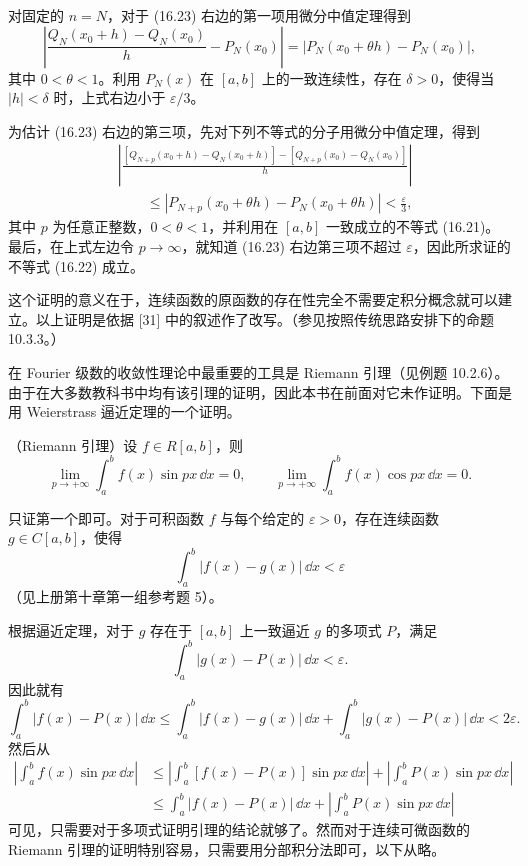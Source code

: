 \begin{xproof}
对固定的 $n=N$，对于 (16.23) 右边的第一项用微分中值定理得到
\[
  \left|\frac{Q_N(x_0+h)-Q_N(x_0)}h-P_N(x_0)\right|
  =|P_N(x_0+\theta h)-P_N(x_0)|,
\]
其中 $0<\theta<1$。利用 $P_N(x)$ 在 $[a,b]$ 上的一致连续性，存在 $\delta>0$，使得当 $|h|<\delta$ 时，上式右边小于 $\varepsilon/3$。

为估计 (16.23) 右边的第三项，先对下列不等式的分子用微分中值定理，得到
\[
\begin{aligned}
&\left|\frac{[Q_{N+p}(x_0+h)-Q_N(x_0+h)]-[Q_{N+p}(x_0)-Q_N(x_0)]}{h}\right|\\
&\qquad\leqslant|P_{N+p}(x_0+\theta h)-P_N(x_0+\theta h)|<\frac\varepsilon3,
\end{aligned}
\]
其中 $p$ 为任意正整数，$0<\theta<1$，并利用在 $[a,b]$ 一致成立的不等式 (16.21)。最后，在上式左边令 $p\to\infty$，就知道 (16.23) 右边第三项不超过 $\varepsilon$，因此所求证的不等式 (16.22) 成立。
\end{xproof}

\begin{xremark}
这个证明的意义在于，连续函数的原函数的存在性完全不需要定积分概念就可以建立。以上证明是依据 [31] 中的叙述作了改写。（参见按照传统思路安排下的命题 10.3.3。）
\end{xremark}

在 Fourier 级数的收敛性理论中最重要的工具是 Riemann 引理（见例题 10.2.6）。由于在大多数教科书中均有该引理的证明，因此本书在前面对它未作证明。下面是用 Weierstrass 逼近定理的一个证明。

\begin{xexample}[16.3.2]
（Riemann 引理）设 $f\in R[a,b]$，则
\[
  \lim_{p\to+\infty}\int_a^b f(x)\sin px\,\dd x=0,
  \qquad
  \lim_{p\to+\infty}\int_a^b f(x)\cos px\,\dd x=0.
\]
\end{xexample}

\begin{xproof}
只证第一个即可。对于可积函数 $f$ 与每个给定的 $\varepsilon>0$，存在连续函数 $g\in C[a,b]$，使得
\[
  \int_a^b|f(x)-g(x)|\,\dd x<\varepsilon
\]
（见上册第十章第一组参考题 5）。

根据逼近定理，对于 $g$ 存在于 $[a,b]$ 上一致逼近 $g$ 的多项式 $P$，满足
\[
  \int_a^b|g(x)-P(x)|\,\dd x<\varepsilon.
\]
因此就有
\[
  \int_a^b|f(x)-P(x)|\,\dd x
  \leqslant\int_a^b|f(x)-g(x)|\,\dd x
  +\int_a^b|g(x)-P(x)|\,\dd x<2\varepsilon.
\]
然后从
\[
\begin{aligned}
  \left|\int_a^b f(x)\sin px\,\dd x\right|
  &\leqslant\left|\int_a^b[f(x)-P(x)]\sin px\,\dd x\right|
   +\left|\int_a^bP(x)\sin px\,\dd x\right|\\
  &\leqslant\int_a^b|f(x)-P(x)|\,\dd x
   +\left|\int_a^bP(x)\sin px\,\dd x\right|
\end{aligned}
\]
可见，只需要对于多项式证明引理的结论就够了。然而对于连续可微函数的 Riemann 引理的证明特别容易，只需要用分部积分法即可，以下从略。
\end{xproof}

